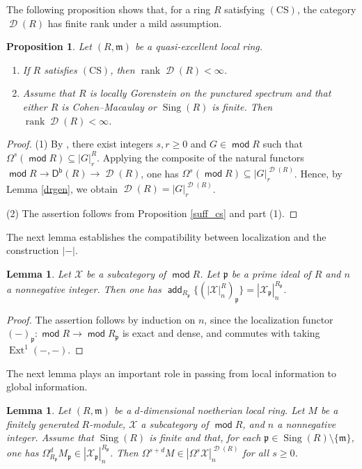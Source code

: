 \documentclass[10pt]{amsart}
\newtheorem{lem}[thm]{Lemma}
\newtheorem{prop}[thm]{Proposition}
\theoremstyle{definition}
\theoremstyle{remark}
\numberwithin{equation}{thm}
\def\add{\operatorname{\mathsf{add}}}
\def\d{\operatorname{\mathscr{D}}}
\def\db{\operatorname{\mathsf{D^b}}}
\def\Ext{\operatorname{Ext}}
\def\ge{\geqslant}
\def\m{\mathfrak{m}}
\def\mod{\operatorname{\mathsf{mod}}}
\def\p{\mathfrak{p}}
\def\rank{\operatorname{rank}}
\def\Sing{\operatorname{Sing}}
\def\X{\mathcal{X}}
\begin{document}
The following proposition shows that, for a ring $R$ satisfying $(\mathrm{CS})$, the category $\d(R)$ has finite rank under a mild assumption.
\begin{prop}\label{rankfin1}
Let $(R,\m)$ be a quasi-excellent local ring.
\begin{enumerate}[\rm(1)]
\item
If $R$ satisfies $(\mathrm{CS})$, then $\rank\d(R)<\infty$.
\item
Assume that $R$ is locally Gorenstein on the punctured spectrum and that either $R$ is Cohen--Macaulay or $\Sing(R)$ is finite.
Then $\rank\d(R)<\infty$.
\end{enumerate}
\end{prop}
\begin{proof}
(1) By \cite[Corollary 3.12]{DLT}, there exist integers $s,r\ge0$ and $G\in\mod R$ such that $\Omega^{s}(\mod R)\subseteq{|G|}_{r}^{R}$.
Applying the composite of the natural functors $\mod R\to\db(R)\to\d(R)$, one has $\Omega^{s}(\mod R)\subseteq{|G|}_{r}^{\d(R)}$.
Hence, by Lemma \ref{drgen}, we obtain $\d(R)={|G|}_{r}^{\d(R)}$.

(2) The assertion follows from Proposition \ref{suff_cs} and part (1).
\end{proof}
The next lemma establishes the compatibility between localization and the construction $|-|$.
\begin{lem}\label{lem_add}
Let $\X$ be a subcategory of $\mod R$.
Let $\p$ be a prime ideal of $R$ and $n$ a nonnegative integer.
Then one has $\add_{R_{\p}}\{({|\X|}_{n}^{R})_{\p}\}={|\X_{\p}|}_{n}^{R_{\p}}$.
\end{lem}
\begin{proof}
The assertion follows by induction on $n$, since the localization functor $(-)_{\p}:\mod R \to \mod R_{\p}$ is exact and dense, and commutes with taking $\Ext^{1}(-,-)$.
\end{proof}
The next lemma plays an important role in passing from local information to global information.
\begin{lem}\label{lem_lift}
Let $(R,\m)$ be a $d$-dimensional noetherian local ring.
Let $M$ be a finitely generated $R$-module, $\X$ a subcategory of $\mod R$, and $n$ a nonnegative integer.
Assume that $\Sing(R)$ is finite and that, for each $\p\in\Sing(R)\setminus\{\m\}$, one has $\Omega^{d}_{R_{\p}}M_{\p}\in{|\X_{\p}|}_{n}^{R_{\p}}$.
Then $\Omega^{s+d}M\in{|\Omega^{s}\X|}_{n}^{\d(R)}$ for all $s\ge0$.
\end{lem}
\end{document}

